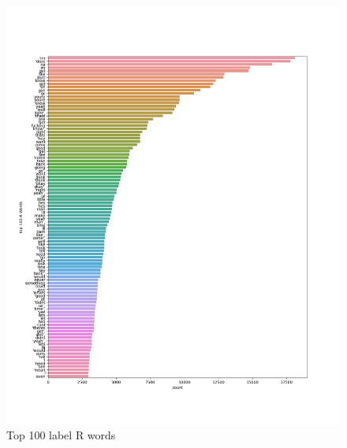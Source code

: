 \documentclass[a4paper]{article}
\begin{document}
\begin{figure}[ht]
    \centering
    \includegraphics[width=1\textwidth]{../stats/top_100_R_words.png}
    \caption{Top 100 label R words}
\end{figure}
\end{document}
